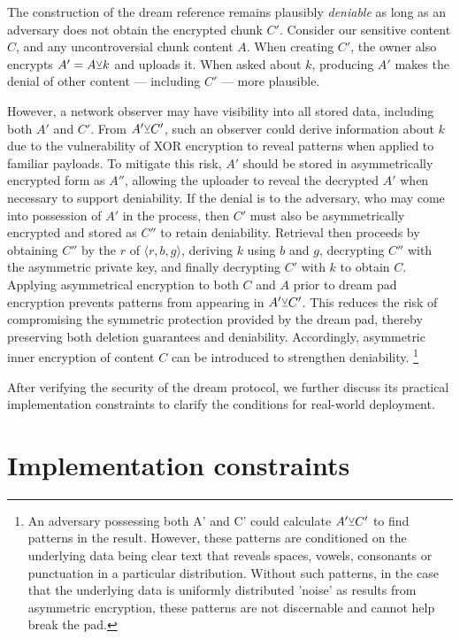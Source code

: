 \documentclass[singlecolumn]{acmart}
\newcommand\xor{\text{\small$\veebar$}}
\begin{document}
The construction of the dream reference remains plausibly \emph{deniable} as long as an adversary does not obtain the encrypted chunk $C'$. Consider our sensitive content $C$, and any uncontroversial chunk content $A$. When creating $C'$, the owner also encrypts $A'=A\xor k$ and uploads it. When asked about $k$, producing $A'$ makes the denial of other content — including $C'$ — more plausible. 

However, a network observer may have visibility into all stored data, including both $A'$ and $C'$. From $A'\xor C'$, such an observer could derive information about $k$ due to the vulnerability of XOR encryption to reveal patterns when applied to familiar payloads. To mitigate this risk, $A'$ should be stored in asymmetrically encrypted form as $A''$, allowing the uploader to reveal the decrypted $A'$ when necessary to support deniability. If the denial is to the adversary, who may come into possession of $A'$ in the process, then $C'$ must also be asymmetrically encrypted and stored as $C''$ to retain deniability. Retrieval then proceeds by obtaining $C''$ by the $r$ of $\langle r,b,g \rangle$, deriving $k$ using $b$ and $g$, decrypting $C''$ with the asymmetric private key, and finally decrypting $C'$ with $k$ to obtain $C$. Applying asymmetrical encryption to both $C$ and $A$ prior to dream pad encryption prevents patterns from appearing in $A'\xor C'$. This reduces the risk of compromising the symmetric protection provided  by the dream pad, thereby preserving both deletion guarantees and deniability. Accordingly, asymmetric inner encryption of content $C$ can be introduced to strengthen deniability.%
%
\footnote{An adversary possessing both A' and C' could calculate $A'\xor C'$ to find patterns in the result. However, these patterns are conditioned on the underlying data being clear text that reveals spaces, vowels, consonants or punctuation in a particular distribution. Without such patterns, in the case that the underlying data is uniformly distributed 'noise' as results from asymmetric encryption, these patterns are not discernable and cannot help break the pad. }

After verifying the security of the dream protocol, we further discuss its
practical implementation constraints to clarify the conditions for real-world deployment.

\section{Implementation constraints}\label{sec:constraints}
\end{document}
